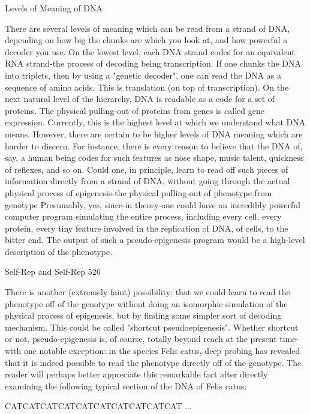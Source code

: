{                                 Levels of Meaning of DNA

There are several levels of meaning which can be read from a strand of DNA, depending on
how big the chunks are which you look at, and how powerful a decoder you use. On the
lowest level, each DNA strand codes for an equivalent RNA strand-the process of decoding
being transcription. If one chunks the DNA into triplets, then by using a "genetic decoder",
one can read the DNA as a sequence of amino acids. This is translation (on top of
transcription). On the next natural level of the hierarchy, DNA is readable as a code for a set
of proteins. The physical pulling-out of proteins from genes is called gene expression.
Currently, this is the highest level at which we understand what DNA means.
        However, there are certain to be higher levels of DNA meaning which are harder to
discern. For instance, there is every reason to believe that the DNA of, say, a human being
codes for such features as nose shape, music talent, quickness of reflexes, and so on. Could
one, in principle, learn to read off such pieces of information directly from a strand of DNA,
without going through the actual physical process of epigenesis-the physical pulling-out of
phenotype from genotype Presumably, yes, since-in theory-one could have an incredibly
powerful computer program simulating the entire process, including every cell, every protein,
every tiny feature involved in the replication of DNA, of cells, to the bitter end. The output of
such a pseudo-epigenesis program would be a high-level description of the phenotype.




Self-Rep and Self-Rep                                                                        526

  There is another (extremely faint) possibility: that we could learn to read the phenotype off
of the genotype without doing an isomorphic simulation of the physical process of
epigenesis, but by finding some simpler sort of decoding mechanism. This could be called
"shortcut pseudoepigenesis". Whether shortcut or not, pseudo-epigenesis is, of course, totally
beyond reach at the present time-with one notable exception: in the species Felis catus, deep
probing has revealed that it is indeed possible to read the phenotype directly off of the
genotype. The reader will perhaps better appreciate this remarkable fact after directly
examining the following typical section of the DNA of Felis catus:

                   CATCATCATCATCATCATCATCATCATCAT ...

}
